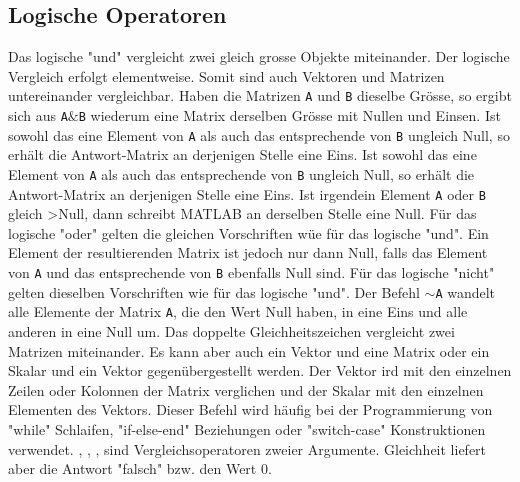 {\subsection{Logische Operatoren}
Das logische "und" \boxed{\textbf{\texttt{\&}}} vergleicht zwei gleich grosse Objekte miteinander. Der logische Vergleich erfolgt elementweise. Somit sind auch Vektoren und Matrizen untereinander vergleichbar. 
\newline\newline
Haben die Matrizen \texttt{A} und \texttt{B} dieselbe Grösse, so ergibt sich aus \texttt{A$\&$B} wiederum eine Matrix derselben Grösse mit Nullen und Einsen. Ist sowohl das eine Element von \texttt{A} als auch das entsprechende von \texttt{B} ungleich Null, so erhält die Antwort-Matrix an derjenigen Stelle eine Eins. 
\newline\newline
Ist sowohl das eine Element von \texttt{A} als auch das entsprechende von \texttt{B} ungleich Null, so erhält die Antwort-Matrix an derjenigen Stelle eine Eins. Ist irgendein Element \texttt{A} oder \texttt{B} gleich >Null, dann schreibt MATLAB an derselben Stelle eine Null.
\newline\newline
Für das logische "oder" \boxed{\textbf{\texttt{$\vert$}}} gelten die gleichen Vorschriften wüe für das logische "und". Ein Element der resultierenden Matrix ist jedoch nur dann Null, falls das Element von \texttt{A} und das entsprechende von \texttt{B} ebenfalls Null sind.
\newline\newline
Für das logische "nicht" \boxed{\textbf{\texttt{$\sim$}}} gelten dieselben Vorschriften wie für das logische "und". Der Befehl \texttt{$\sim$A} wandelt alle Elemente der Matrix \texttt{A}, die den Wert Null haben, in eine Eins und alle anderen in eine Null um.
\newline\newline
Das doppelte Gleichheitszeichen \boxed{\textbf{\texttt{==}}} vergleicht zwei Matrizen miteinander. Es kann aber auch ein Vektor und eine Matrix oder ein Skalar und ein Vektor gegenübergestellt werden. Der Vektor ird mit den einzelnen Zeilen oder Kolonnen der Matrix verglichen und der Skalar mit den einzelnen Elementen des Vektors. Dieser Befehl wird häufig bei der Programmierung von "while" Schlaifen, "if-else-end" Beziehungen oder "switch-case" Konstruktionen verwendet. 
\newline\newline
\boxed{\textbf{\texttt{>}}}, \boxed{\textbf{\texttt{<}}}, \boxed{\textbf{\texttt{<=}}}, \boxed{\textbf{\texttt{>=}}} sind Vergleichsoperatoren zweier Argumente. Gleichheit liefert aber die Antwort "falsch" bzw. den Wert 0.
}
